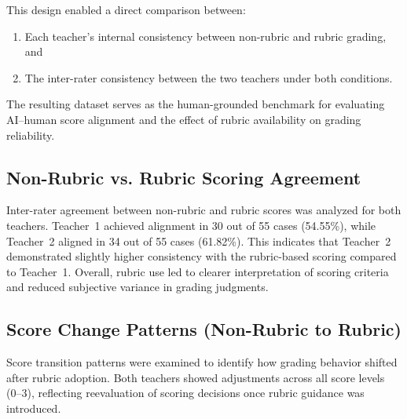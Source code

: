 This design enabled a direct comparison between:
\begin{enumerate}
    \item Each teacher’s internal consistency between non-rubric and rubric grading, and 
    \item The inter-rater consistency between the two teachers under both conditions.
\end{enumerate}

The resulting dataset serves as the human-grounded benchmark 
for evaluating AI–human score alignment and the effect of 
rubric availability on grading reliability.

\subsection{Non-Rubric vs. Rubric Scoring Agreement}

Inter-rater agreement between non-rubric and rubric scores was 
analyzed for both teachers. Teacher~1 achieved 
alignment in 30 out of 55 cases (54.55\%), while 
Teacher~2 aligned in 34 out of 55 cases (61.82\%). 
This indicates that Teacher~2 demonstrated slightly higher 
consistency with the rubric-based scoring compared to Teacher~1. 
Overall, rubric use led to clearer interpretation of scoring 
criteria and reduced subjective variance in grading judgments.

\subsection{Score Change Patterns (Non-Rubric to Rubric)}

Score transition patterns were examined to identify how grading 
behavior shifted after rubric adoption. Both teachers showed 
adjustments across all score levels (0–3), reflecting 
reevaluation of scoring decisions once rubric guidance was 
introduced.

